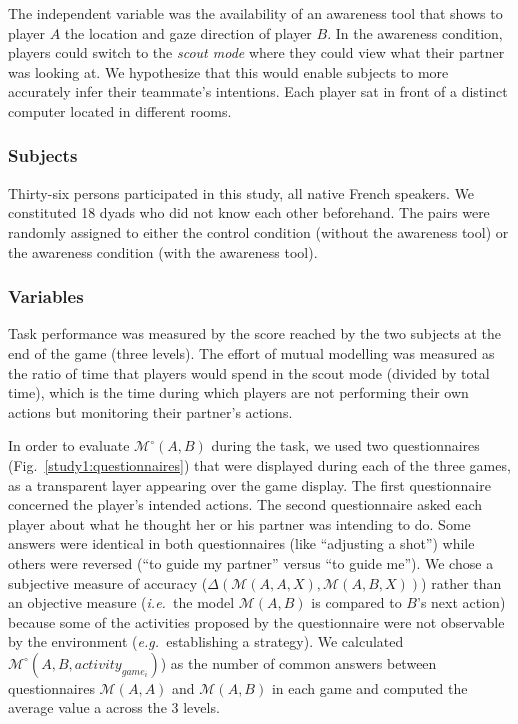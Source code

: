 \documentclass[natbib]{svjour3}
\newcommand{\ie}{{\textit{i.e.\ }}}
\newcommand{\eg}{{\textit{e.g.\ }}}
\newcommand{\M}[3]{{\mathcal{M}(#1, #2, #3)}}
\newcommand{\gmodel}[2]{{$\mathcal{M}(#1, #2)$}}
\newcommand{\Model}[3]{{$\mathcal{M}^{\circ}(#1, #2, #3)$}}
\newcommand{\gModel}[2]{{$\mathcal{M}^{\circ}(#1, #2)$}}
\begin{document}
The independent variable was the availability of an awareness tool that shows to
player $A$  the location and gaze direction of player $B$. In the awareness
condition, players could switch to the \emph{scout mode} where they could view what
their partner was looking at. We hypothesize that this would enable subjects to
more accurately infer their teammate's intentions. Each player sat in front of a
distinct computer located in different rooms. 

\subsubsection*{Subjects}

Thirty-six persons participated in this study, all native French speakers. We
constituted 18 dyads who did not know each other beforehand. The pairs were
randomly assigned to either the control condition (without the awareness tool)
or the awareness condition (with the awareness tool).

\subsubsection*{Variables}

Task performance was measured by the score reached by the two subjects at the
end of the game (three levels). The effort of mutual modelling was measured as
the ratio of time that players would spend in the scout mode (divided by total
time), which is the time during which players are not performing their own
actions but monitoring their partner's actions.

In order to evaluate \gModel{A}{B} during the task, we used two questionnaires
(Fig.~\ref{study1:questionnaires}) that were displayed during each of the three
games, as a transparent layer appearing over the game display. The first
questionnaire concerned the player's intended actions. The second questionnaire
asked each player about what he thought her or his partner was intending to do.
Some answers were identical in both questionnaires (like ``adjusting a shot'')
while others were reversed (``to guide my partner'' versus ``to guide me''). We
chose a subjective measure of accuracy ($\Delta(\M{A}{A}{X}, \M{A}{B}{X})$)
rather than an objective measure (\ie the model \gmodel{A}{B} is compared to $B$'s
next action) because some of the activities proposed by the questionnaire were not
observable by the environment (\eg establishing a strategy). We calculated
\Model{A}{B}{activity_{game_{i}}}) as the number of common answers between
questionnaires \gmodel{A}{A} and \gmodel{A}{B} in each game and computed the
average value a across the 3 levels.
\end{document}
